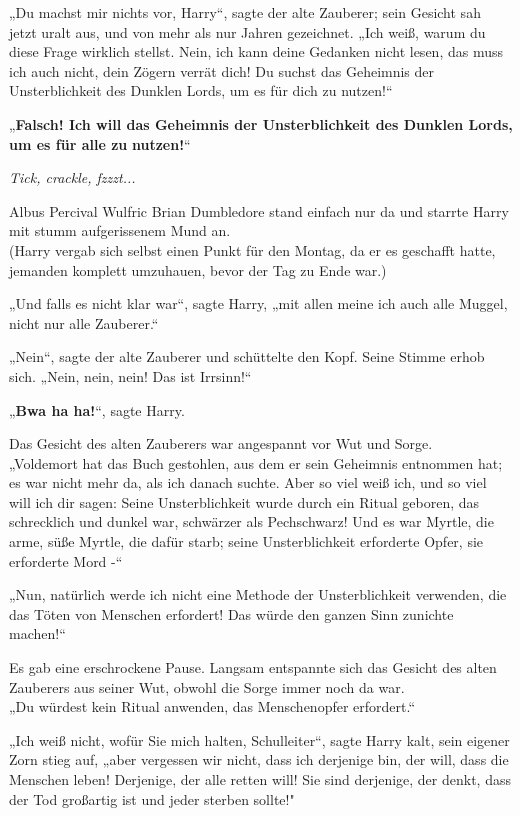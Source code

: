 {„Du machst mir nichts vor, Harry“, sagte der alte Zauberer; sein Gesicht sah jetzt uralt aus, und von mehr als nur Jahren gezeichnet. „Ich weiß, warum du diese Frage wirklich stellst. Nein, ich kann deine Gedanken nicht lesen, das muss ich auch nicht, dein Zögern verrät dich! Du suchst das Geheimnis der Unsterblichkeit des Dunklen Lords, um es für dich zu nutzen!“

„\textbf{Falsch! Ich will das Geheimnis der Unsterblichkeit des Dunklen Lords, um es für alle zu} \textbf{nutzen!}“

\emph{Tick, crackle, fzzzt...}

Albus Percival Wulfric Brian Dumbledore stand einfach nur da und starrte Harry mit stumm aufgerissenem Mund an.\\ (Harry vergab sich selbst einen Punkt für den Montag, da er es geschafft hatte, jemanden komplett umzuhauen, bevor der Tag zu Ende war.)

„Und falls es nicht klar war“, sagte Harry, „mit allen meine ich auch alle Muggel, nicht nur alle Zauberer.“

„Nein“, sagte der alte Zauberer und schüttelte den Kopf. Seine Stimme erhob sich. „Nein, nein, nein! Das ist Irrsinn!“

„\textbf{Bwa ha ha!}“, sagte Harry.

Das Gesicht des alten Zauberers war angespannt vor Wut und Sorge.\\ „Voldemort hat das Buch gestohlen, aus dem er sein Geheimnis entnommen hat; es war nicht mehr da, als ich danach suchte. Aber so viel weiß ich, und so viel will ich dir sagen: Seine Unsterblichkeit wurde durch ein Ritual geboren, das schrecklich und dunkel war, schwärzer als Pechschwarz! Und es war Myrtle, die arme, süße Myrtle, die dafür starb; seine Unsterblichkeit erforderte Opfer, sie erforderte Mord -“

„Nun, natürlich werde ich nicht eine Methode der Unsterblichkeit verwenden, die das Töten von Menschen erfordert! Das würde den ganzen Sinn zunichte machen!“

Es gab eine erschrockene Pause. Langsam entspannte sich das Gesicht des alten Zauberers aus seiner Wut, obwohl die Sorge immer noch da war.\\ „Du würdest kein Ritual anwenden, das Menschenopfer erfordert.“

„Ich weiß nicht, wofür Sie mich halten, Schulleiter“, sagte Harry kalt, sein eigener Zorn stieg auf, „aber vergessen wir nicht, dass ich derjenige bin, der will, dass die Menschen leben! Derjenige, der alle retten will! Sie sind derjenige, der denkt, dass der Tod großartig ist und jeder sterben sollte!"

}
